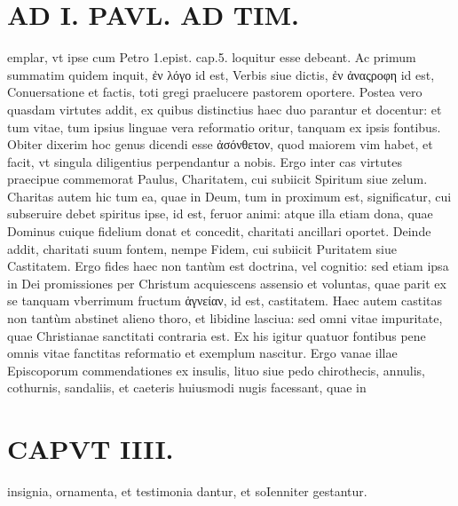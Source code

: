 \documentclass{article}
\begin{document}
\begin{pages}
\section*{AD I. PAVL. AD TIM. }
\marginpar{[ p.230 ]}\pstart emplar, vt ipse cum Petro 1.epist. cap.5. loquitur esse debeant. Ac primum summatim quidem inquit, ἐν λόγο id est, Verbis siue dictis, ἐν ἀναςροφη id est, Conuersatione et factis, toti gregi praelucere pastorem oportere. Postea vero quasdam virtutes addit, ex quibus distinctius haec duo parantur et docentur: et tum vitae, tum ipsius linguae vera reformatio oritur, tanquam ex ipsis fontibus. Obiter dixerim hoc genus dicendi esse ἀσόνθετον, quod maiorem vim habet, et facit, vt singula diligentius perpendantur a nobis. Ergo inter cas virtutes praecipue commemorat Paulus, Charitatem, cui subiicit Spiritum siue zelum. Charitas autem hic tum ea, quae in Deum, tum in proximum est, significatur, cui subseruire debet spiritus ipse, id est, feruor animi: atque illa etiam dona, quae Dominus cuique fidelium donat et concedit, charitati ancillari oportet. Deinde addit, charitati suum fontem, nempe Fidem, cui subiicit Puritatem siue Castitatem. Ergo fides haec non tantùm est doctrina, vel cognitio: sed etiam ipsa in Dei promissiones per Christum acquiescens assensio et voluntas, quae parit ex se tanquam vberrimum fructum ἁγνείαν, id est, castitatem. Haec autem castitas non tantùm abstinet alieno thoro, et libidine lasciua: sed omni vitae impuritate, quae Christianae sanctitati contraria est. Ex his igitur quatuor fontibus pene omnis vitae fanctitas reformatio et exemplum nascitur. Ergo vanae illae Episcoporum commendationes ex insulis, lituo siue pedo chirothecis, annulis, cothurnis, sandaliis, et caeteris huiusmodi nugis facessant, quae in  \pend
\section*{CAPVT  IIII. }
\marginpar{[ p.231 ]}\pstart insignia, ornamenta, et testimonia dantur, et soIenniter gestantur.  \pend
{}
{}

\end{pages}
\end{document}

